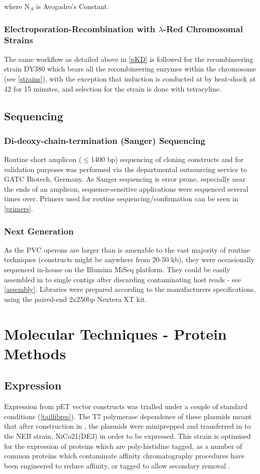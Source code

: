 \noindent where $\mathrm{N}_{A}$ is Avogadro's Constant.

\subsubsection{Electroporation-Recombination with $\lambda$-Red Chromosomal Strains}
The same workflow as detailed above in \vref{pKD} is followed for the recombineering strain DY380 which bears all the recombineering enzymes within the chromosome (see \vref{strains}), with the exception that induction is conducted at \OD{} by heat-shock at 42\degC{} for 15 minutes, and selection for the strain is done with tetracyline. 


\subsection{Sequencing}
	\subsubsection{Di-deoxy-chain-termination (Sanger) Sequencing}\label{Sanger}
	Routine short amplicon ($\leq$1400 bp) sequencing of cloning constructs and for validation purposes was performed via the departmental outsourcing service to GATC Biotech, Germany. As Sanger sequencing is error prone, especially near the ends of an amplicon, sequence-sensitive applications were sequenced several times over.
	Primers used for routine sequencing/confirmation can be seen in \vref{primers}.
	
	\subsubsection{Next Generation}
	As the PVC operons are larger than is amenable to the vast majority of routine techniques (constructs might be anywhere from 20-50 kb), they were occasionally sequenced in-house on the Illumina MiSeq platform. They could be easily assembled in to single contigs after discarding contaminating host reads - see \vref{assembly}. Libraries were prepared according to the manufacturers specifications, using the paired-end 2x250bp Nextera XT kit.




\section{Molecular Techniques - Protein Methods}
\subsection{Expression}
	Expression from pET vector constructs was trialled under a couple of standard conditions (\vref{tailfibres}). The T7 polymerase dependence of these plasmids meant that after construction in \Ec, the plasmids were miniprepped and transferred in to the NEB strain, NiCo21(DE3) in order to be expressed. This strain is optimised for the expression of proteins which are poly-histidine tagged, as a number of common proteins which contaminate affinity chromatography procedures have been engineered to reduce affinity, or tagged to allow secondary removal \citep{Bolanos-Garcia2006, Robichon2011}.


